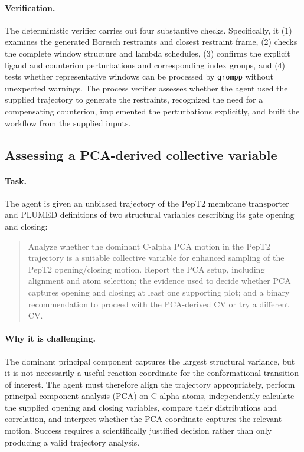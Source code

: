 \documentclass[11pt,a4paper]{article}
\begin{document}
\paragraph{Verification.}
The deterministic verifier carries out four substantive checks. Specifically, it (1) examines the generated Boresch restraints and closest restraint frame, (2) checks the complete window structure and lambda schedules, (3) confirms the explicit ligand and counterion perturbations and corresponding index groups, and (4) tests whether representative windows can be processed by \texttt{grompp} without unexpected warnings. The process verifier assesses whether the agent used the supplied trajectory to generate the restraints, recognized the need for a compensating counterion, implemented the perturbations explicitly, and built the workflow from the supplied inputs.

\subsection{Assessing a PCA-derived collective variable}
\label{app:task22}

\paragraph{Task.}
The agent is given an unbiased trajectory of the PepT2 membrane transporter and PLUMED definitions of two structural variables describing its gate opening and closing:

\begin{quote}
Analyze whether the dominant C-alpha PCA motion in the PepT2 trajectory is a suitable collective variable for enhanced sampling of the PepT2 opening/closing motion. Report the PCA setup, including alignment and atom selection; the evidence used to decide whether PCA captures opening and closing; at least one supporting plot; and a binary recommendation to proceed with the PCA-derived CV or try a different CV.
\end{quote}

\paragraph{Why it is challenging.}
The dominant principal component captures the largest structural variance, but it is not necessarily a useful reaction coordinate for the conformational transition of interest. The agent must therefore align the trajectory appropriately, perform principal component analysis (PCA) on C-alpha atoms, independently calculate the supplied opening and closing variables, compare their distributions and correlation, and interpret whether the PCA coordinate captures the relevant motion. Success requires a scientifically justified decision rather than only producing a valid trajectory analysis.
\end{document}
